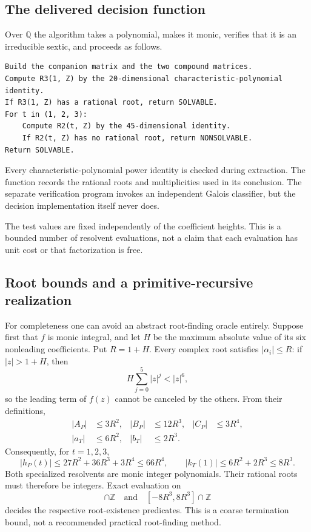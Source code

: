 \documentclass[11pt,letterpaper]{article}
\numberwithin{equation}{section}
\theoremstyle{definition}
\theoremstyle{remark}
\newcommand{\QQ}{\mathbb Q}
\newcommand{\ZZ}{\mathbb Z}
\begin{document}
\subsection{The delivered decision function}
Over $\QQ$ the algorithm takes a polynomial, makes it monic, verifies that it
is an irreducible sextic, and proceeds as follows.
\begin{lstlisting}
Build the companion matrix and the two compound matrices.
Compute R3(1, Z) by the 20-dimensional characteristic-polynomial identity.
If R3(1, Z) has a rational root, return SOLVABLE.
For t in (1, 2, 3):
    Compute R2(t, Z) by the 45-dimensional identity.
    If R2(t, Z) has no rational root, return NONSOLVABLE.
Return SOLVABLE.
\end{lstlisting}
Every characteristic-polynomial power identity is checked during extraction.
The function records the rational roots and multiplicities used in its
conclusion. The separate verification program invokes an independent Galois
classifier, but the decision implementation itself never does.

The test values are fixed independently of the coefficient heights. This
is a bounded number of resolvent evaluations, not a claim that each evaluation
has unit cost or that factorization is free.

\subsection{Root bounds and a primitive-recursive realization}
For completeness one can avoid an abstract root-finding oracle entirely.
Suppose first that $f$ is monic integral, and let $H$ be the maximum absolute
value of its six nonleading coefficients. Put $R=1+H$. Every complex root
satisfies $|\alpha_i|\le R$: if $|z|>1+H$, then
\[
 H\sum_{j=0}^5|z|^j<|z|^6,
\]
so the leading term of $f(z)$ cannot be canceled by the others.
From their definitions,
\begin{align*}
 |A_P|&\le3R^2,& |B_P|&\le12R^3,& |C_P|&\le3R^4,\\
 |a_T|&\le6R^2,& |b_T|&\le2R^3.
\end{align*}
Consequently, for $t=1,2,3$,
\begin{equation}
 |h_P(t)|\le27R^2+36R^3+3R^4\le66R^4,
 \qquad |k_T(1)|\le6R^2+2R^3\le8R^3.
 \label{tpo:eq:bounds}
\end{equation}
Both specialized resolvents are monic integer polynomials. Their rational
roots must therefore be integers. Exact evaluation on
\begin{equation}
 [-66R^4,66R^4]\cap\ZZ\quad\text{and}\quad[-8R^3,8R^3]\cap\ZZ
 \label{tpo:eq:boxes}
\end{equation}
decides the respective root-existence predicates. This is a coarse termination
bound, not a recommended practical root-finding method.
\end{document}
